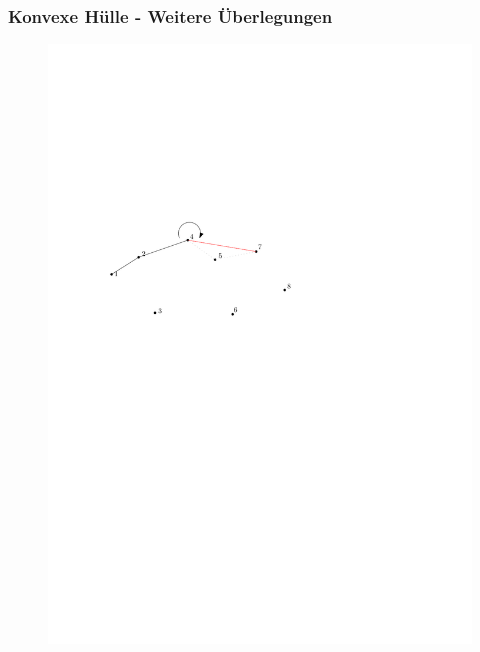 \begin{frame}
	\frametitle{{Konvexe Hülle - Weitere Überlegungen}}
\begin{figure}[htbp]
	\begin{center}
  	\includegraphics[width=.8\linewidth]{bilder/graham8}
	\end{center}
\end{figure}
\end{frame}

